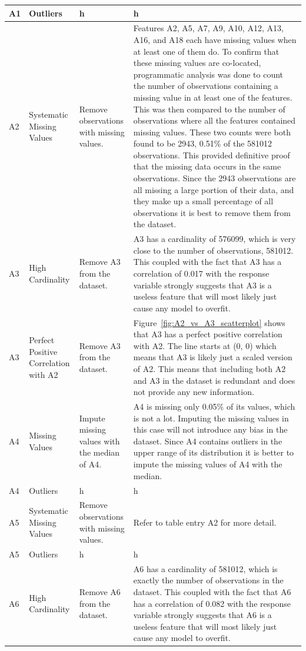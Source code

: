 \documentclass[11pt]{report}
\begin{document}
\begin{longtable}{lp{4cm}p{4cm}p{5cm}}
A1 & Outliers & h & h \\
\midrule
A2 & Systematic Missing Values & Remove observations with missing values. & Features A2, A5, A7, A9, A10, A12, A13, A16, and A18 each have missing values when at least one of them do. To confirm that these missing values are co-located, programmatic analysis was done to count the number of observations containing a missing value in at least one of the features. This was then compared to the number of observations where all the features contained missing values. These two counts were both found to be 2943, 0.51\% of the 581012 observations. This provided definitive proof that the missing data occurs in the same observations. Since the 2943 observations are all missing a large portion of their data, and they make up a small percentage of all observations it is best to remove them from the dataset. \\
\midrule
A3 & High Cardinality & Remove A3 from the dataset. & A3 has a cardinality of 576099, which is very close to the number of observations, 581012. This coupled with the fact that A3 has a correlation of 0.017 with the response variable strongly suggests that A3 is a useless feature that will most likely just cause any model to overfit.\\
\midrule
A3 & Perfect Positive Correlation with A2 & Remove A3 from the dataset. & Figure~\ref{fig:A2_vs_A3_scatterplot} shows that A3 has a perfect positive correlation with A2. The line starts at (0, 0) which means that A3 is likely just a scaled version of A2. This means that including both A2 and A3 in the dataset is redundant and does not provide any new information. \\
\midrule
A4 & Missing Values & Impute missing values with the median of A4. & A4 is missing only 0.05\% of its values, which is not a lot. Imputing the missing values in this case will not introduce any bias in the dataset. Since A4 contains outliers in the upper range of its distribution it is better to impute the missing values of A4 with the median. \\
\midrule
A4 & Outliers & h & h \\
\midrule
A5 & Systematic Missing Values & Remove observations with missing values. & Refer to table entry A2 for more detail. \\
\midrule
A5 & Outliers & h & h \\
\midrule
A6 & High Cardinality & Remove A6 from the dataset. & A6 has a cardinality of 581012, which is exactly the number of observations in the dataset. This coupled with the fact that A6 has a correlation of 0.082 with the response variable strongly suggests that A6 is a useless feature that will most likely just cause any model to overfit. \\

\end{longtable}
\end{document}
